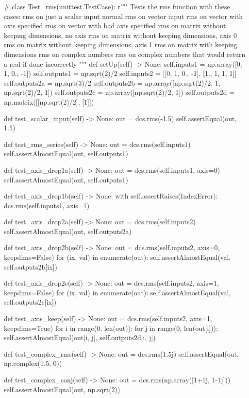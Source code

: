 \documentclass[12pt]{article}
\begin{document}
\begin{Python}
#%
class Test_rms(unittest.TestCase):
    r"""
    Tests the rms function with these cases:
        rms on just a scalar input
        normal rms on vector input
        rms on vector with axis specified
        rms on vector with bad axis specified
        rms on matrix without keeping dimensions, no axis
        rms on matrix without keeping dimensions, axis 0
        rms on matrix without keeping dimensions, axis 1
        rms on matrix with keeping dimensions
        rms on complex numbers
        rms on complex numbers that would return a real if done incorrectly
    """
    def setUp(self) -> None:
        self.inputs1   = np.array([0, 1, 0., -1])
        self.outputs1  = np.sqrt(2)/2
        self.inputs2   = [[0, 1, 0., -1], [1., 1, 1, 1]]
        self.outputs2a = np.sqrt(3)/2
        self.outputs2b = np.array([np.sqrt(2)/2, 1, np.sqrt(2)/2, 1])
        self.outputs2c = np.array([np.sqrt(2)/2, 1])
        self.outputs2d = np.matrix([[np.sqrt(2)/2], [1]])

    def test_scalar_input(self) -> None:
        out = dcs.rms(-1.5)
        self.assertEqual(out, 1.5)

    def test_rms_series(self) -> None:
        out = dcs.rms(self.inputs1)
        self.assertAlmostEqual(out, self.outputs1)

    def test_axis_drop1a(self) -> None:
        out = dcs.rms(self.inputs1, axis=0)
        self.assertAlmostEqual(out, self.outputs1)

    def test_axis_drop1b(self) -> None:
        with self.assertRaises(IndexError):
            dcs.rms(self.inputs1, axis=1)

    def test_axis_drop2a(self) -> None:
        out = dcs.rms(self.inputs2)
        self.assertAlmostEqual(out, self.outputs2a)

    def test_axis_drop2b(self) -> None:
        out = dcs.rms(self.inputs2, axis=0, keepdims=False)
        for (ix, val) in enumerate(out):
            self.assertAlmostEqual(val, self.outputs2b[ix])

    def test_axis_drop2c(self) -> None:
        out = dcs.rms(self.inputs2, axis=1, keepdims=False)
        for (ix, val) in enumerate(out):
            self.assertAlmostEqual(val, self.outputs2c[ix])

    def test_axis_keep(self) -> None:
        out = dcs.rms(self.inputs2, axis=1, keepdims=True)
        for i in range(0, len(out)):
            for j in range(0, len(out[i])):
                self.assertAlmostEqual(out[i, j], self.outputs2d[i, j])

    def test_complex_rms(self) -> None:
        out = dcs.rms(1.5j)
        self.assertEqual(out, np.complex(1.5, 0))

    def test_complex_conj(self) -> None:
        out = dcs.rms(np.array([1+1j, 1-1j]))
        self.assertAlmostEqual(out, np.sqrt(2))
\end{Python}
\end{document}
